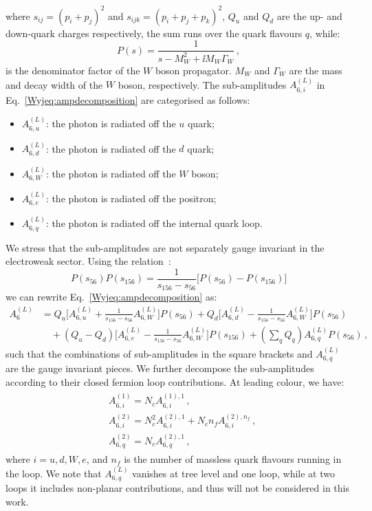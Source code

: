 \documentclass[main.tex]{subfiles}
\begin{document}
where $s_{ij}=(p_i+p_j)^2$ and $s_{ijk}=(p_i+p_j+p_k)^2$, $Q_u$ and $Q_d$ are the up- and down-quark charges respectively, the sum runs over the quark flavours $q$, while: 
\begin{equation}
P(s) = \frac{1}{s-M_W^2+\ii M_W \Gamma_W} \,,
\end{equation}
is the denominator factor of the $W$ boson propagator. 
$M_W$ and $\Gamma_W$ are the mass and decay width of the $W$ boson, respectively.
The sub-amplitudes $A_{6,i}^{(L)}$ in Eq.~\ref{Wyjeq:ampdecomposition} are categorised as follows:
\begin{itemize}
\item $A^{(L)}_{6,u}$: the photon is radiated off the $u$ quark;
\item $A^{(L)}_{6,d}$: the photon is radiated off the $d$ quark;
\item $A^{(L)}_{6,W}$: the photon is radiated off the $W$ boson;
\item $A^{(L)}_{6,e}$: the photon is radiated off the positron;
\item $A^{(L)}_{6,q}$: the photon is radiated off the internal quark loop.
\end{itemize}
%
We stress that the sub-amplitudes are not separately gauge invariant in the electroweak sector.
Using the relation~\cite{Campbell:2021mlr}:
\begin{equation}
P(s_{56})P(s_{156}) = \frac{1}{s_{156}-s_{56}} \bigg[ P(s_{56}) - P(s_{156}) \bigg] 
\end{equation}
we can rewrite Eq.~\ref{Wyjeq:ampdecomposition} as:
\begin{align}
A_{6}^{(L)} & =   Q_u \bigg[ A^{(L)}_{6,u} + \frac{1}{s_{156}-s_{56}} A^{(L)}_{6,W} \bigg] P(s_{56})
                + Q_d \bigg[ A^{(L)}_{6,d} - \frac{1}{s_{156}-s_{56}} A^{(L)}_{6,W} \bigg] P(s_{56}) \nonumber \\
&         \quad + (Q_u - Q_d) \bigg[ A^{(L)}_{6,e} - \frac{1}{s_{156}-s_{56}} A^{(L)}_{6,W} \bigg] P(s_{156})
          + \left(\sum_q Q_q\right) A^{(L)}_{6,q} P(s_{56}) \,, 
\label{Wyjeq:gaugeinvariantamps}
\end{align}
such that the combinations of sub-amplitudes in the square brackets and $A^{(L)}_{6,q}$ are the gauge invariant pieces.
We further decompose the sub-amplitudes according to their closed fermion loop contributions. At leading colour, we have:
\begin{align} \label{Wyjeq:NFdecomposition}
\begin{aligned}
& A^{(1)}_{6,i} = N_c A^{(1),1}_{6,i} \,, \\
& A^{(2)}_{6,i} = N_c^2 A^{(2),1}_{6,i} + N_c n_f A^{(2),n_f}_{6,i} \,, \\
& A^{(2)}_{6,q} = N_c A^{(2),1}_{6,q}  \,,
\end{aligned}
\end{align}
where  $i=u,d,W,e$, and $n_f$ is the number of massless quark flavours running in the loop. 
We note that $A^{(L)}_{6,q}$ vanishes at tree level and one loop, while at two loops it includes non-planar contributions, and thus will not be considered in this work.
\end{document}
